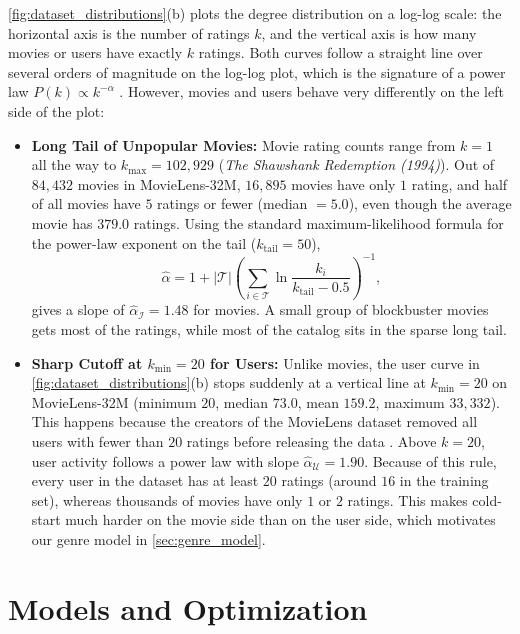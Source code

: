 \documentclass{article}
\theoremstyle{plain}
\theoremstyle{definition}
\begin{document}
\cref{fig:dataset_distributions}(b) plots the degree distribution on a log-log scale: the horizontal axis is the number of ratings $k$, and the vertical axis is how many movies or users have exactly $k$ ratings. Both curves follow a straight line over several orders of magnitude on the log-log plot, which is the signature of a power law $P(k) \propto k^{-\alpha}$ \cite{clauset2009power}. However, movies and users behave very differently on the left side of the plot:
\begin{itemize}
    \item \textbf{Long Tail of Unpopular Movies:} Movie rating counts range from $k=1$ all the way to $k_{\max} = 102{,}929$ (\emph{The Shawshank Redemption (1994)}). Out of $84{,}432$ movies in MovieLens-32M, $16{,}895$ movies have only $1$ rating, and half of all movies have $5$ ratings or fewer (median $= 5.0$), even though the average movie has $379.0$ ratings. Using the standard maximum-likelihood formula for the power-law exponent \cite{clauset2009power} on the tail ($k_{\text{tail}} = 50$),
    \begin{equation}
        \hat{\alpha} = 1 + |\mathcal{T}| \left(\sum_{i \in \mathcal{T}} \ln \frac{k_i}{k_{\text{tail}} - 0.5}\right)^{-1},
        \label{eq:clauset_mle}
    \end{equation}
    gives a slope of $\hat{\alpha}_{\mathcal{I}} = 1.48$ for movies. A small group of blockbuster movies gets most of the ratings, while most of the catalog sits in the sparse long tail.
    \item \textbf{Sharp Cutoff at $k_{\min} = 20$ for Users:} Unlike movies, the user curve in \cref{fig:dataset_distributions}(b) stops suddenly at a vertical line at $k_{\min} = 20$ on MovieLens-32M (minimum $20$, median $73.0$, mean $159.2$, maximum $33{,}332$). This happens because the creators of the MovieLens dataset removed all users with fewer than $20$ ratings before releasing the data \cite{harper2015movielens}. Above $k = 20$, user activity follows a power law with slope $\hat{\alpha}_{\mathcal{U}} = 1.90$. Because of this rule, every user in the dataset has at least $20$ ratings (around $16$ in the training set), whereas thousands of movies have only $1$ or $2$ ratings. This makes cold-start much harder on the movie side than on the user side, which motivates our genre model in \cref{sec:genre_model}.
\end{itemize}

\section{Models and Optimization}
\label{sec:bias_model}
\end{document}

